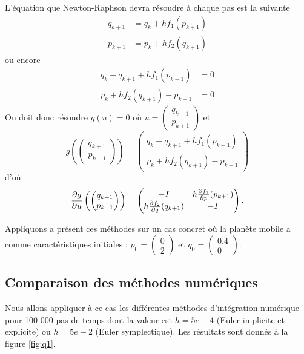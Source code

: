 L'équation que Newton-Raphson devra résoudre à chaque pas est la suivante
\begin{align*}
  q_{k+1} & = q_k + hf_1(p_{k+1})\\
  p_{k+1} & = p_k + hf_2(q_{k+1})
\end{align*}
ou encore
\begin{align*}
  q_k - q_{k+1} + hf_1(p_{k+1}) & = 0\\
  p_k + hf_2(q_{k+1}) - p_{k+1} & = 0
\end{align*}
On doit donc résoudre $g(u) = 0$ où
$u =
\begin{pmatrix}
  q_{k+1}\\
  p_{k+1}
\end{pmatrix}$
et
\[
  g
  \left(
    \begin{pmatrix}
      q_{k+1}\\
      p_{k+1}
    \end{pmatrix}
  \right) =
  \begin{pmatrix}
    q_k - q_{k+1} + hf_1(p_{k+1})\\
    p_k + hf_2(q_{k+1}) - p_{k+1}
  \end{pmatrix}
\]
d'où
\[
  \frac{\partial g}{\partial u}
  \left(
    \begin{pmatrix}
      q_{k+1}\\
      p_{k+1}
    \end{pmatrix}
  \right) =
  \begin{pmatrix}
    -I & h\frac{\partial f_1}{\partial p}(p_{k+1})\\
    h\frac{\partial f_2}{\partial q}(q_{k+1}) & -I
  \end{pmatrix}.
\]

Appliquons a présent ces méthodes sur un cas concret où la planète mobile a comme caractéristiques initiales : $p_0 = \begin{pmatrix}
0\\
2
\end{pmatrix}
$ et $q_0 = \begin{pmatrix}
0.4\\
0
\end{pmatrix} 
$.\\

\subsection{Comparaison des méthodes numériques}
Nous allons appliquer à ce cas les différentes méthodes d'intégration numérique pour 100 000 pas de temps dont la valeur est $h=5e-4$ (Euler implicite et explicite) ou $h=5e-2$ (Euler symplectique). Les résultats sont donnés à la figure \ref{fig:q1}.


